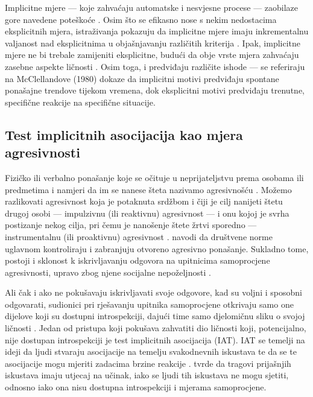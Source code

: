 \documentclass[a4paper, 12pt]{report}
\begin{document}
Implicitne mjere --- koje zahvaćaju automatske i nesvjesne procese --- zaobilaze
gore navedene poteškoće \citep{uhlmann2012getting, wileyhandzgal}. Osim što se
efikasno nose s nekim nedostacima eksplicitnih mjera, istraživanja pokazuju da
implicitne mjere imaju inkrementalnu valjanost nad eksplicitnima u objašnjavanju
različitih kriterija \citep{greenwald2009meta, banse2015predicting,
    galic2016conditional, galic2014validity}.
Ipak, implicitne  mjere ne bi trebale zamijeniti eksplicitne, budući da obje
vrste mjera zahvaćaju zasebne aspekte ličnosti \citep{bing2007integrating}. Osim
toga, i predviđaju različite ishode --- \citet{mcclelland1989self} se
referiraju na McClellandove (1980) dokaze da implicitni motivi predviđaju
spontane ponašajne trendove tijekom vremena, dok eksplicitni motivi predviđaju
trenutne, specifične reakcije na specifične situacije.

\subsection{Test implicitnih asocijacija kao mjera agresivnosti}Fizičko ili verbalno ponašanje koje se
očituje u neprijateljstvu
prema osobama ili predmetima i namjeri da im se nanese šteta nazivamo
agresivnošću \citep{rjecnik}.
Možemo razlikovati agresivnost koja je potaknuta srdžbom i čiji je cilj nanijeti
štetu drugoj osobi --- impulzivnu (ili reaktivnu) agresivnost --- i onu kojoj je svrha
postizanje nekog cilja, pri čemu je nanošenje štete žrtvi sporedno ---
instrumentalnu (ili proaktivnu) agresivnost \citep{rjecnik,brugman2014identifying}.
\citet{reeve} navodi da društvene norme uglavnom kontroliraju i zabranjuju
otvoreno agresivno ponašanje. Sukladno tome, postoji i 
sklonost k iskrivljavanju odgovora na upitnicima samoprocjene agresivnosti,
upravo zbog njene socijalne nepoželjnosti \citep{banse2015predicting}.

Ali čak i ako ne pokušavaju iskrivljavati svoje odgovore, kad su voljni i
sposobni odgovarati, sudionici pri rješavanju upitnika samoprocjene 
otkrivaju samo one dijelove koji su dostupni introspekciji, dajući time samo
djelomičnu sliku o svojoj ličnosti \citep{wileyhandzgal}.
Jedan od pristupa koji pokušava zahvatiti
dio ličnosti koji, potencijalno, nije dostupan introspekciji je test implicitnih
asocijacija (IAT).  IAT se temelji na ideji da ljudi stvaraju asocijacije na
temelju svakodnevnih iskustava te da se te asocijacije mogu mjeriti zadacima
brzine reakcije \citep{wileyhandzgal}. \citet{greenwald1995implicit} tvrde da
tragovi prijašnjih iskustava imaju utjecaj na učinak, iako se ljudi tih
iskustava ne mogu sjetiti, odnosno iako ona nisu dostupna introspekciji i mjerama
samoprocjene.  
  
\end{document}
